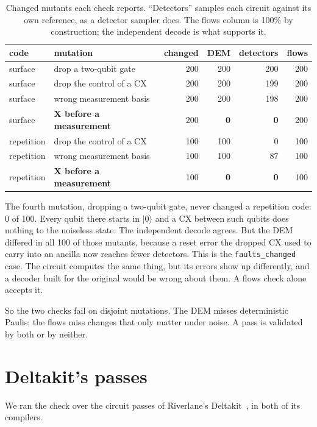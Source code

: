 \documentclass[10pt]{article}
\begin{document}
\begin{table}[h]
\centering
\begin{tabular}{llrrrr}
\toprule
code & mutation & changed & DEM & detectors & flows \\
\midrule
surface & drop a two-qubit gate & 200 & 200 & 200 & 200 \\
surface & drop the control of a CX & 200 & 200 & 199 & 200 \\
surface & wrong measurement basis & 200 & 200 & 198 & 200 \\
surface & \textbf{X before a measurement} & 200 & \textbf{0} & \textbf{0} & 200 \\
repetition & drop the control of a CX & 100 & 100 & 0 & 100 \\
repetition & wrong measurement basis & 100 & 100 & 87 & 100 \\
repetition & \textbf{X before a measurement} & 100 & \textbf{0} & \textbf{0} & 100 \\
\bottomrule
\end{tabular}
\caption{Changed mutants each check reports. ``Detectors'' samples each circuit
against its own reference, as a detector sampler does. The flows column is
100\% by construction; the independent decode is what supports it.}
\end{table}

The fourth mutation, dropping a two-qubit gate, never changed a repetition code:
0 of 100. Every qubit there starts in $|0\rangle$ and a CX between such qubits
does nothing to the noiseless state. The independent decode agrees. But the DEM
differed in all 100 of those mutants, because a reset error the dropped CX used
to carry into an ancilla now reaches fewer detectors. This is the
\texttt{faults\_changed} case. The circuit computes the same thing, but its
errors show up differently, and a decoder built for the original would be
wrong about them. A flows check alone accepts it.

So the two checks fail on disjoint mutations. The DEM misses deterministic
Paulis; the flows miss changes that only matter under noise. A pass is
validated by both or by neither.

\section{Deltakit's passes}

We ran the check over the circuit passes of Riverlane's
Deltakit~\cite{deltakit}, in both of its compilers.
\end{document}
